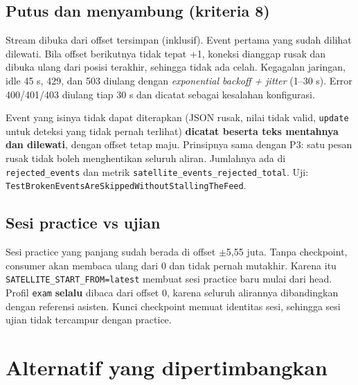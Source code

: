 \subsection{Putus dan menyambung (kriteria 8)}

Stream dibuka dari offset tersimpan (inklusif). Event pertama yang sudah dilihat dilewati. Bila offset berikutnya tidak tepat +1, koneksi dianggap rusak dan dibuka ulang dari posisi terakhir, sehingga tidak ada celah. Kegagalan jaringan, idle 45 s, 429, dan 503 diulang dengan \emph{exponential backoff + jitter} (1--30 s). Error 400/401/403 diulang tiap 30 s dan dicatat sebagai kesalahan konfigurasi.


Event yang isinya tidak dapat diterapkan (JSON rusak, nilai tidak valid, \texttt{update} untuk deteksi yang tidak pernah terlihat) \textbf{dicatat beserta teks mentahnya dan dilewati}, dengan offset tetap maju. Prinsipnya sama dengan P3: satu pesan rusak tidak boleh menghentikan seluruh aliran. Jumlahnya ada di \texttt{rejected\_\allowbreak{}events} dan metrik \texttt{satellite\_\allowbreak{}events\_\allowbreak{}rejected\_\allowbreak{}total}. Uji: \texttt{Test\allowbreak{}Broken\allowbreak{}Events\allowbreak{}Are\allowbreak{}Skipped\allowbreak{}Without\allowbreak{}Stalling\allowbreak{}The\allowbreak{}Feed}.


\subsection{Sesi practice vs ujian}

Sesi practice yang panjang sudah berada di offset $\pm$5,55 juta. Tanpa checkpoint, consumer akan membaca ulang dari 0 dan tidak pernah mutakhir. Karena itu \texttt{SATELLITE\_\allowbreak{}START\_\allowbreak{}FROM=\allowbreak{}latest} membuat sesi practice baru mulai dari head. Profil \texttt{exam} \textbf{selalu} dibaca dari offset 0, karena seluruh alirannya dibandingkan dengan referensi asisten. Kunci checkpoint memuat identitas sesi, sehingga sesi ujian tidak tercampur dengan practice.


\section{Alternatif yang dipertimbangkan}

